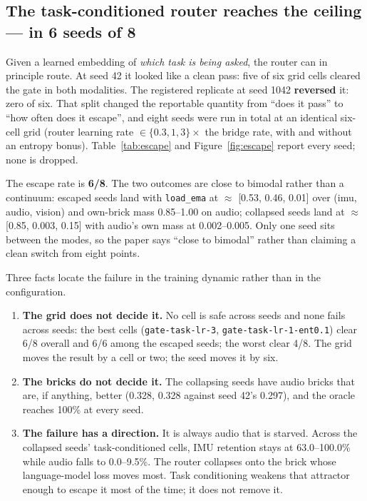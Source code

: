 \documentclass[11pt]{article}
\begin{document}
\subsection{The task-conditioned router reaches the ceiling --- in 6 seeds of 8}
Given a learned embedding of \emph{which task is being asked}, the router can in principle route. At seed 42 it looked like a clean pass: five of six grid cells cleared the gate in both modalities. The registered replicate at seed 1042 \textbf{reversed} it: zero of six. That split changed the reportable quantity from ``does it pass'' to ``how often does it escape'', and eight seeds were run in total at an identical six-cell grid (router learning rate $\in \{0.3, 1, 3\} \times$ the bridge rate, with and without an entropy bonus). Table~\ref{tab:escape} and Figure~\ref{fig:escape} report every seed; none is dropped.

The escape rate is \textbf{6/8}. The two outcomes are close to bimodal rather than a continuum: escaped seeds land with \texttt{load\_ema} at $\approx$ [0.53, 0.46, 0.01] over (imu, audio, vision) and own-brick mass 0.85--1.00 on audio; collapsed seeds land at $\approx$ [0.85, 0.003, 0.15] with audio's own mass at 0.002--0.005. Only one seed sits between the modes, so the paper says ``close to bimodal'' rather than claiming a clean switch from eight points.

Three facts locate the failure in the training dynamic rather than in the configuration.

\begin{enumerate}
  \item \textbf{The grid does not decide it.} No cell is safe across seeds and none fails across seeds: the best cells (\texttt{gate-task-lr-3}, \texttt{gate-task-lr-1-ent0.1}) clear 6/8 overall and 6/6 among the escaped seeds; the worst clear 4/8. The grid moves the result by a cell or two; the seed moves it by six.
  \item \textbf{The bricks do not decide it.} The collapsing seeds have audio bricks that are, if anything, better (0.328, 0.328 against seed 42's 0.297), and the oracle reaches 100\% at every seed.
  \item \textbf{The failure has a direction.} It is always audio that is starved. Across the collapsed seeds' task-conditioned cells, IMU retention stays at 63.0--100.0\% while audio falls to 0.0--9.5\%. The router collapses onto the brick whose language-model loss moves most. Task conditioning weakens that attractor enough to escape it most of the time; it does not remove it.
\end{enumerate}
\end{document}
